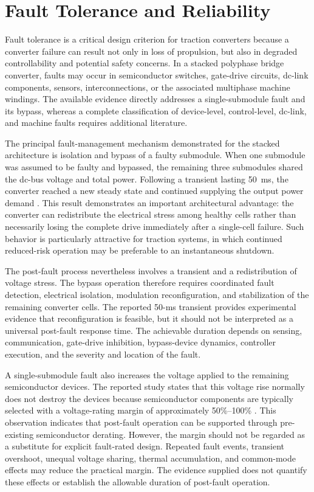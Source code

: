 \section{Fault Tolerance and Reliability}

Fault tolerance is a critical design criterion for traction converters because a converter failure can result not only in loss of propulsion, but also in degraded controllability and potential safety concerns. In a stacked polyphase bridge converter, faults may occur in semiconductor switches, gate-drive circuits, dc-link components, sensors, interconnections, or the associated multiphase machine windings. The available evidence directly addresses a single-submodule fault and its bypass, whereas a complete classification of device-level, control-level, dc-link, and machine faults requires additional literature. %

The principal fault-management mechanism demonstrated for the stacked architecture is isolation and bypass of a faulty submodule. When one submodule was assumed to be faulty and bypassed, the remaining three submodules shared the dc-bus voltage and total power. Following a transient lasting 50~ms, the converter reached a new steady state and continued supplying the output power demand \cite{Jin2017}. This result demonstrates an important architectural advantage: the converter can redistribute the electrical stress among healthy cells rather than necessarily losing the complete drive immediately after a single-cell failure. Such behavior is particularly attractive for traction systems, in which continued reduced-risk operation may be preferable to an instantaneous shutdown.

The post-fault process nevertheless involves a transient and a redistribution of voltage stress. The bypass operation therefore requires coordinated fault detection, electrical isolation, modulation reconfiguration, and stabilization of the remaining converter cells. The reported 50-ms transient provides experimental evidence that reconfiguration is feasible, but it should not be interpreted as a universal post-fault response time. The achievable duration depends on sensing, communication, gate-drive inhibition, bypass-device dynamics, controller execution, and the severity and location of the fault. %

A single-submodule fault also increases the voltage applied to the remaining semiconductor devices. The reported study states that this voltage rise normally does not destroy the devices because semiconductor components are typically selected with a voltage-rating margin of approximately 50\%--100\% \cite{Jin2017}. This observation indicates that post-fault operation can be supported through pre-existing semiconductor derating. However, the margin should not be regarded as a substitute for explicit fault-rated design. Repeated fault events, transient overshoot, unequal voltage sharing, thermal accumulation, and common-mode effects may reduce the practical margin. The evidence supplied does not quantify these effects or establish the allowable duration of post-fault operation. %

